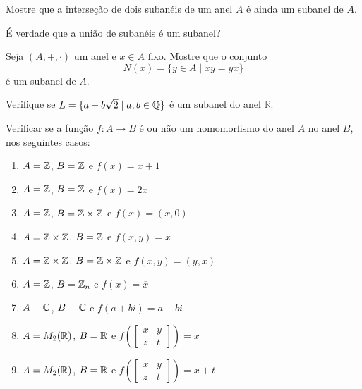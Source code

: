 \documentclass[12pt]{exam}
\begin{document}
\vspace{.3cm}

\questao{} Mostre que a interse\c{c}\~ao de dois suban\'eis de um anel $A$ \'e ainda um subanel de $A$.

\vspace{.3cm}

\questao{} É verdade que a união de subanéis é um subanel?

\vspace{.3cm}

\questao{} Seja $(A, + , \cdot)$ um anel e $x \in A$ fixo. Mostre que o conjunto
\[
	N(x) = \{y \in A \mid xy = yx\}
\]
\'e um subanel de $A$.

\vspace{.3cm}

\questao{} Verifique se $L = \{ a + b\sqrt{2} \mid a, b \in \mathbb{Q}\}$ {\'e} um subanel
do anel $\mathbb{R}$.

\vspace{.3cm}

 Verificar se a fun\c{c}\~ao $f : A \to B$ \'e ou n\~ao um homomorfismo do anel $A$ no anel $B$, nos seguintes casos:
\begin{enumerate}[label=({\alph*})]
\item $A = \mathbb{Z}$, $B = \mathbb{Z}$ e $f(x) = x + 1$
\item $A = \mathbb{Z}$, $B = \mathbb{Z}$ e $f(x) = 2x$
\item $A = \mathbb{Z}$, $B = \mathbb{Z} \times \mathbb{Z}$ e $f(x) = (x, 0)$
\item $A = \mathbb{Z} \times \mathbb{Z}$, $B = \mathbb{Z}$ e $f(x,y) = x$
\item $A = \mathbb{Z} \times \mathbb{Z}$, $B = \mathbb{Z} \times \mathbb{Z}$ e $f(x,y) = (y,x)$
\item $A = \mathbb{Z}$, $B = \mathbb{Z}_n$ e $f(x) = \overline{x}$
\item $A = \mathbb{C}$, $B = \mathbb{C}$ e $f(a + bi) = a - bi$
\item $A = M_2(\mathbb{R})$, $B = \mathbb{R}$ e $f\left(\begin{bmatrix}
	x & y\\z & t
\end{bmatrix}\right) = x$
\item $A = M_2(\mathbb{R})$, $B = \mathbb{R}$ e $f\left(\begin{bmatrix}
	x & y\\z & t
\end{bmatrix}\right) = x + t$
\end{enumerate}

\vspace{.3cm}
\end{document}
